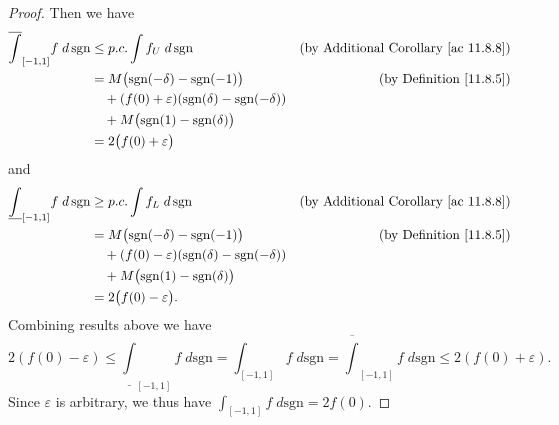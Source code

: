 \begin{proof}
    Then we have
    \begin{align*}
        \overline{\int}_{[-1, 1]} f \; d \, \text{sgn} & \leq p.c. \int f_U \; d \, \text{sgn}                                   & \text{(by Additional Corollary \ref{ac 11.8.8})} \\
                                                       & = M \big(\text{sgn}(-\delta) - \text{sgn}(-1)\big)                      & \text{(by Definition \ref{11.8.5})}              \\
                                                       & \quad + (f(0) + \varepsilon) (\text{sgn}(\delta) - \text{sgn}(-\delta))                                                    \\
                                                       & \quad + M \big(\text{sgn}(1) - \text{sgn}(\delta)\big)                                                                     \\
                                                       & = 2\big(f(0) + \varepsilon\big)
    \end{align*}
    and
    \begin{align*}
        \underline{\int}_{[-1, 1]} f \; d \, \text{sgn} & \geq p.c. \int f_L \; d \, \text{sgn}                                   & \text{(by Additional Corollary \ref{ac 11.8.8})} \\
                                                        & = M \big(\text{sgn}(-\delta) - \text{sgn}(-1)\big)                      & \text{(by Definition \ref{11.8.5})}              \\
                                                        & \quad + (f(0) - \varepsilon) (\text{sgn}(\delta) - \text{sgn}(-\delta))                                                    \\
                                                        & \quad + M \big(\text{sgn}(1) - \text{sgn}(\delta)\big)                                                                     \\
                                                        & = 2\big(f(0) - \varepsilon\big).
    \end{align*}
    Combining results above we have
    \[
        2(f(0) - \varepsilon) \leq \underline{\int}_{[-1, 1]} f \; d \text{sgn} = \int_{[-1, 1]} f \; d \text{sgn} = \overline{\int}_{[-1, 1]} f \; d \text{sgn} \leq 2(f(0) + \varepsilon).
    \]
    Since \(\varepsilon\) is arbitrary, we thus have \(\int_{[-1, 1]} f \; d \text{sgn} = 2f(0)\).
\end{proof}